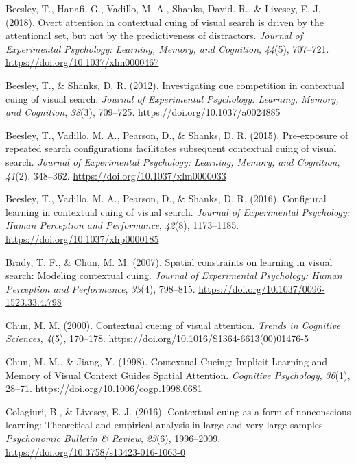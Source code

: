 \documentclass[
  man,
  floatsintext,
  longtable,
  nolmodern,
  notxfonts,
  notimes,
  colorlinks=true,linkcolor=blue,citecolor=blue,urlcolor=blue]{apa7}
\newlength{\cslhangindent}
\newenvironment{CSLReferences}[2] %
 {\begin{list}{}{%
  \setlength{\itemindent}{0pt}
  \setlength{\leftmargin}{0pt}
  \setlength{\parsep}{0pt}
  \ifodd #1
   \setlength{\leftmargin}{\cslhangindent}
   \setlength{\itemindent}{-1\cslhangindent}
  \fi
  \setlength{\itemsep}{#2\baselineskip}}}
 {\end{list}}
\begin{document}
\label{refs}
\begin{CSLReferences}{1}{0}
Beesley, T., Hanafi, G., Vadillo, M. A., Shanks, David. R., \& Livesey,
E. J. (2018). Overt attention in contextual cuing of visual search is
driven by the attentional set, but not by the predictiveness of
distractors. \emph{Journal of Experimental Psychology: Learning, Memory,
and Cognition}, \emph{44}(5), 707--721.
\url{https://doi.org/10.1037/xlm0000467}

Beesley, T., \& Shanks, D. R. (2012). Investigating cue competition in
contextual cuing of visual search. \emph{Journal of Experimental
Psychology: Learning, Memory, and Cognition}, \emph{38}(3), 709--725.
\url{https://doi.org/10.1037/a0024885}

Beesley, T., Vadillo, M. A., Pearson, D., \& Shanks, D. R. (2015).
Pre-exposure of repeated search configurations facilitates subsequent
contextual cuing of visual search. \emph{Journal of Experimental
Psychology: Learning, Memory, and Cognition}, \emph{41}(2), 348--362.
\url{https://doi.org/10.1037/xlm0000033}

Beesley, T., Vadillo, M. A., Pearson, D., \& Shanks, D. R. (2016).
Configural learning in contextual cuing of visual search. \emph{Journal
of Experimental Psychology: Human Perception and Performance},
\emph{42}(8), 1173--1185. \url{https://doi.org/10.1037/xhp0000185}

Brady, T. F., \& Chun, M. M. (2007). Spatial constraints on learning in
visual search: {Modeling} contextual cuing. \emph{Journal of
Experimental Psychology: Human Perception and Performance},
\emph{33}(4), 798--815. \url{https://doi.org/10.1037/0096-1523.33.4.798}

Chun, M. M. (2000). Contextual cueing of visual attention. \emph{Trends
in Cognitive Sciences}, \emph{4}(5), 170--178.
\url{https://doi.org/10.1016/S1364-6613(00)01476-5}

Chun, M. M., \& Jiang, Y. (1998). Contextual {Cueing}: {Implicit
Learning} and {Memory} of {Visual Context Guides Spatial Attention}.
\emph{Cognitive Psychology}, \emph{36}(1), 28--71.
\url{https://doi.org/10.1006/cogp.1998.0681}

Colagiuri, B., \& Livesey, E. J. (2016). Contextual cuing as a form of
nonconscious learning: {Theoretical} and empirical analysis in large and
very large samples. \emph{Psychonomic Bulletin \& Review}, \emph{23}(6),
1996--2009. \url{https://doi.org/10.3758/s13423-016-1063-0}


\end{CSLReferences}
\end{document}
